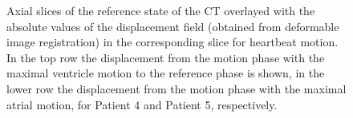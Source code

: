 \begin{figure}[H]
{}
\caption{Axial slices of the reference state of the CT overlayed with the absolute values of the displacement field (obtained from 
deformable image registration) in the corresponding slice for heartbeat motion. In the top row the displacement from the motion phase with the 
maximal ventricle motion to the reference phase is shown, in the lower row the displacement from the motion phase with the maximal 
atrial motion, for Patient 4 and Patient 5, respectively.}
\label{contour_plot_hb}
\end{figure}


